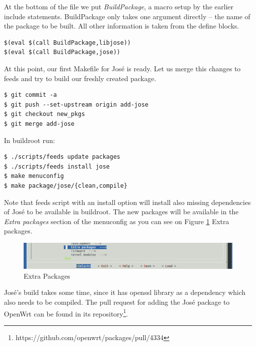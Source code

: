 At the bottom of the file we put {\it BuildPackage}, a macro setup by the earlier include statements.
BuildPackage only takes one argument directly -- the name of the package to be built.
All other information is taken from the define blocks.
\begin{lstlisting}[columns=fixed,basicstyle=\ttfamily\footnotesize,tabsize=4,backgroundcolor=\color{yellow!10}]
$(eval $(call BuildPackage,libjose))
$(eval $(call BuildPackage,jose))
\end{lstlisting}
At this point, our first Makefile for José is ready.
Let us merge this changes to feeds and try to build our freshly created package.
\begin{lstlisting}[columns=fixed,basicstyle=\ttfamily\footnotesize,tabsize=4,backgroundcolor=\color{yellow!10}]
$ git commit -a
$ git push --set-upstream origin add-jose
$ git checkout new_pkgs
$ git merge add-jose
\end{lstlisting}
In buildroot run:
\begin{lstlisting}[columns=fixed,basicstyle=\ttfamily\footnotesize,tabsize=4,backgroundcolor=\color{yellow!10}]
$ ./scripts/feeds update packages
$ ./scripts/feeds install jose
$ make menuconfig
$ make package/jose/{clean,compile}
\end{lstlisting}
Note that feeds script with an install option will install also missing dependencies of José to be available in buildroot.
The new packages will be available in the {\it Extra packages} section of the menuconfig as you can see on Figure \ref{fig_extra} Extra packages.
\begin{figure}[h]
    \centering
    \includegraphics[scale=0.6]{figures/extra_packages.pdf}
    \caption{Extra Packages}
    \label{fig_extra}
\end{figure}
José's build takes some time, since it has openssl library as a dependency which also needs to be compiled.
The pull request for adding the José package to OpenWrt can be found in its repository\footnote{https://github.com/openwrt/packages/pull/4334}.
